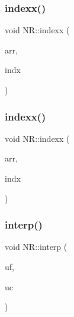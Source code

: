 \subsubsection{\texorpdfstring{indexx()}{indexx()}\hspace{0.1cm}{\footnotesize\ttfamily [1/2]}}
{\footnotesize\ttfamily void N\+R\+::indexx (\begin{DoxyParamCaption}\item[{\mbox{\hyperlink{namespaceNR_a9f943da53862537c552e2a770cb170ae}{Vec\+\_\+\+I\+\_\+\+DP}} \&}]{arr,  }\item[{\mbox{\hyperlink{namespaceNR_ade2338f6d53b7da3dd6d1c04804541f2}{Vec\+\_\+\+O\+\_\+\+I\+NT}} \&}]{indx }\end{DoxyParamCaption})}

\mbox{\label{namespaceNR_ab3cd4fa2aeff189dee20cd3f87378212}} 
\subsubsection{\texorpdfstring{indexx()}{indexx()}\hspace{0.1cm}{\footnotesize\ttfamily [2/2]}}
{\footnotesize\ttfamily void N\+R\+::indexx (\begin{DoxyParamCaption}\item[{\mbox{\hyperlink{namespaceNR_ae67ce7dc86a8a64a7ce73c3c030ff610}{Vec\+\_\+\+I\+\_\+\+I\+NT}} \&}]{arr,  }\item[{\mbox{\hyperlink{namespaceNR_ade2338f6d53b7da3dd6d1c04804541f2}{Vec\+\_\+\+O\+\_\+\+I\+NT}} \&}]{indx }\end{DoxyParamCaption})}

\mbox{\label{namespaceNR_af65d3c7d1b9eddb10dd001e6456ea45a}} 
\subsubsection{\texorpdfstring{interp()}{interp()}}
{\footnotesize\ttfamily void N\+R\+::interp (\begin{DoxyParamCaption}\item[{\mbox{\hyperlink{namespaceNR_adc1f8da33094b6bbeb1f5f899515ce54}{Mat\+\_\+\+O\+\_\+\+DP}} \&}]{uf,  }\item[{\mbox{\hyperlink{namespaceNR_a2b8abfda8fffad6ba0a1b5a4c0773dbf}{Mat\+\_\+\+I\+\_\+\+DP}} \&}]{uc }\end{DoxyParamCaption})}

